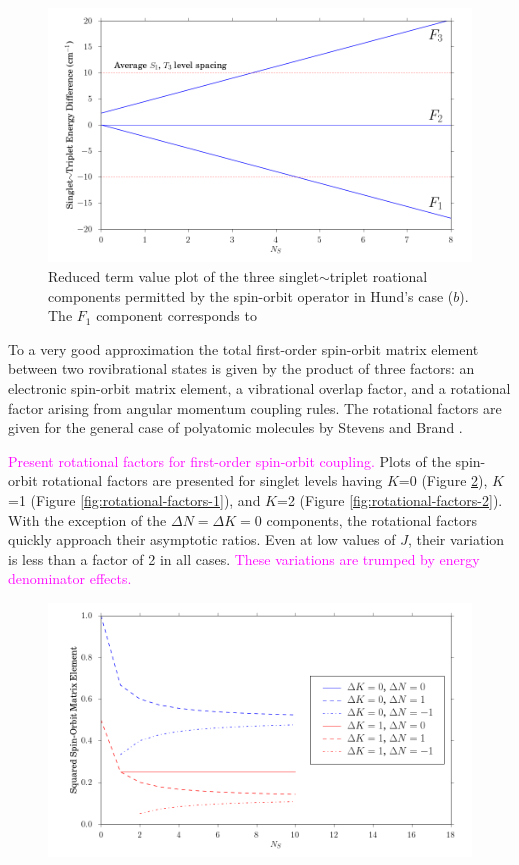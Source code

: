 \documentclass[12pt,draft]{mitthesis}
\newcommand{\POINT}[1]{\textcolor{magenta}{#1}}
\begin{document}
\begin{figure}
  \caption{ Reduced term value plot of the three singlet$\sim$triplet
    roational components permitted by the spin-orbit operator in
    Hund's case ($b$).  The $F_1$ component corresponds to  }
  \label{fig:components}
  \centering
  \includegraphics[width=6in]{f-components.png}
\end{figure}

To a very good approximation the total first-order spin-orbit matrix
element between two rovibrational states is given by the product of
three factors: an electronic spin-orbit matrix element, a vibrational
overlap factor, and a rotational factor arising from angular momentum
coupling rules.  The rotational factors are given for the general case
of polyatomic molecules by Stevens and Brand \cite{stevens73}.  

\POINT{Present rotational factors for first-order spin-orbit
  coupling.}  Plots of the spin-orbit rotational factors are presented
for singlet levels having $K$=0 (Figure
\ref{fig:rotational-factors-0}), $K$=1 (Figure
\ref{fig:rotational-factors-1}), and $K$=2 (Figure
\ref{fig:rotational-factors-2}).  With the exception of the $\Delta N
= \Delta K = 0$ components, the rotational factors quickly approach
their asymptotic ratios.  Even at low values of $J$, their variation
is less than a factor of 2 in all cases.  \POINT{These variations are
  trumped by energy denominator effects.}

\begin{figure}
  \caption{}
  \label{fig:rotational-factors-0}
  \centering
  \includegraphics[width=6in]{rotational_factors_k0.png}
\end{figure}
\end{document}
